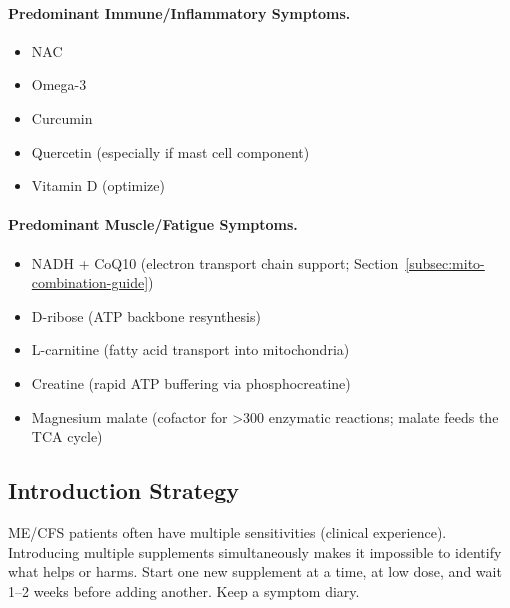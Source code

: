 \paragraph{Predominant Immune/Inflammatory Symptoms.}
\begin{itemize}
    \item NAC
    \item Omega-3
    \item Curcumin
    \item Quercetin (especially if mast cell component)
    \item Vitamin D (optimize)
\end{itemize}

\paragraph{Predominant Muscle/Fatigue Symptoms.}
\begin{itemize}
    \item NADH + CoQ10 (electron transport chain support; Section~\ref{subsec:mito-combination-guide})
    \item D-ribose (ATP backbone resynthesis)
    \item L-carnitine (fatty acid transport into mitochondria)
    \item Creatine (rapid ATP buffering via phosphocreatine)
    \item Magnesium malate (cofactor for >300 enzymatic reactions; malate feeds the TCA cycle)
\end{itemize}

\subsection{Introduction Strategy}

\begin{warning}
ME/CFS patients often have multiple sensitivities (clinical experience). Introducing multiple supplements simultaneously makes it impossible to identify what helps or harms. Start one new supplement at a time, at low dose, and wait 1--2 weeks before adding another. Keep a symptom diary.
\end{warning}

